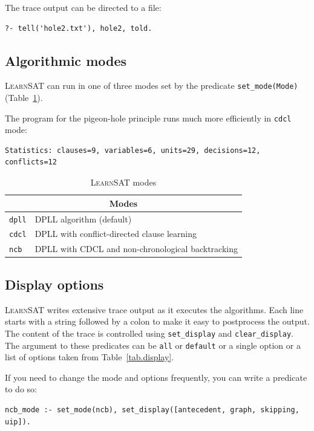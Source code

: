 \documentclass[11pt]{report}
\newcommand*{\p}[1]{\textup{\texttt{#1}}}
\newcommand*{\ls}{\textsc{LearnSAT}}
\begin{document}
The trace output can be directed to a file:

\begin{verbatim}
?- tell('hole2.txt'), hole2, told.
\end{verbatim}

\newpage

\subsection{Algorithmic modes}

\ls{} can run in one of three modes set by the predicate \p{set\_mode(Mode)}
(Table~\ref{tab.modes}).

The program for the pigeon-hole principle runs much more efficiently in
\p{cdcl} mode:
\begin{verbatim}
Statistics: clauses=9, variables=6, units=29, decisions=12, conflicts=12
\end{verbatim}

\begin{table}[*b]
\begin{center}
\begin{tabular}{|l|l|}
\hline
\multicolumn{2}{|c|}{\textbf{\large Modes}}\\
\hline
\p{dpll} & DPLL algorithm (default)\\
\p{cdcl} & DPLL with conflict-directed clause learning\\
\p{ncb} &  DPLL with CDCL and non-chronological backtracking\\
\hline
\end{tabular}
\caption{\ls{} modes}\label{tab.modes}
\end{center}
\end{table}

\subsection{Display options}

\ls{} writes extensive trace output as it executes the algorithms. Each
line starts with a string followed by a colon to make it easy to
postprocess the output. The content of the trace is controlled using
\p{set\_display} and \p{clear\_display}. The argument to these
predicates can be \p{all} or \p{default} or a single option or a list of
options taken from Table~\ref{tab.display}.

If you need to change the mode and options frequently, you
can write a predicate to do so:
\begin{verbatim}
ncb_mode :- set_mode(ncb), set_display([antecedent, graph, skipping, uip]).
\end{verbatim}
\end{document}

